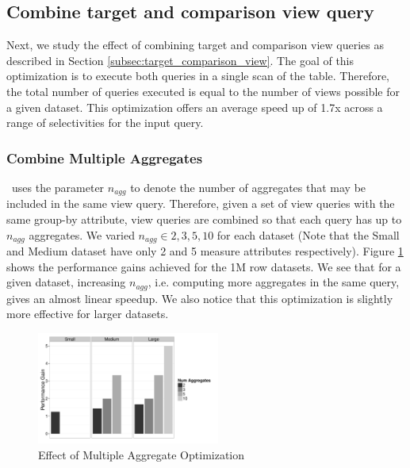 \subsection{Combine target and comparison view query}
Next, we study the effect of combining target and comparison view queries as
described in Section \ref{subsec:target_comparison_view}. The goal of this
optimization is to execute both queries in a single scan of the table.
Therefore, the total number of queries executed is equal to the number of
views possible for a given dataset. This optimization offers an average speed up
of 1.7x across a range of selectivities for the input query.

\subsubsection{Combine Multiple Aggregates}
\SeeDB\ uses the parameter $n_{agg}$ to denote the number of aggregates that may
be included in the same view query. Therefore, given a set of view queries with
the same group-by attribute, view queries are combined so that each query has up
to $n_{agg}$ aggregates. We varied $n_{agg} \in {2, 3, 5, 10}$ for each dataset
(Note that the Small and Medium dataset have only 2 and 5 measure attributes
respectively).
Figure \ref{fig:mult_agg} shows the performance gains achieved for the 1M row
datasets. We see that for a given dataset, increasing $n_{agg}$, i.e. computing
more aggregates in the same query, gives an almost linear speedup. We also
notice that this optimization is slightly more effective for larger datasets.

\begin{figure}[h]

  \centering
    \includegraphics[width=6cm]{Images/mult_agg.pdf}
    \caption{Effect of Multiple Aggregate Optimization} 
      \label{fig:mult_agg}
\end{figure}

